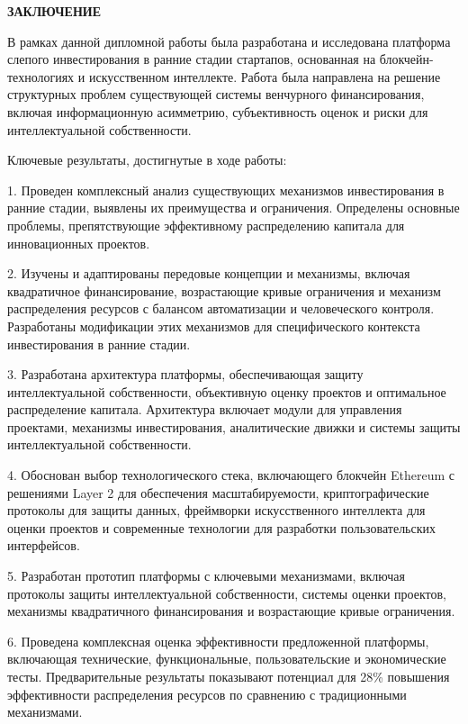 \documentclass[
    candidate, %
    subf, %
    dotsinheaders=false,
]{disser}
\begin{document}
\newpage
\begin{center}
  \textbf{ЗАКЛЮЧЕНИЕ}
\end{center}

В рамках данной дипломной работы была разработана и исследована платформа слепого инвестирования в ранние стадии стартапов, основанная на блокчейн-технологиях и искусственном интеллекте. Работа была направлена на решение структурных проблем существующей системы венчурного финансирования, включая информационную асимметрию, субъективность оценок и риски для интеллектуальной собственности.

Ключевые результаты, достигнутые в ходе работы:

1. Проведен комплексный анализ существующих механизмов инвестирования в ранние стадии, выявлены их преимущества и ограничения. Определены основные проблемы, препятствующие эффективному распределению капитала для инновационных проектов.

2. Изучены и адаптированы передовые концепции и механизмы, включая квадратичное финансирование, возрастающие кривые ограничения и механизм распределения ресурсов с балансом автоматизации и человеческого контроля. Разработаны модификации этих механизмов для специфического контекста инвестирования в ранние стадии.

3. Разработана архитектура платформы, обеспечивающая защиту интеллектуальной собственности, объективную оценку проектов и оптимальное распределение капитала. Архитектура включает модули для управления проектами, механизмы инвестирования, аналитические движки и системы защиты интеллектуальной собственности.

4. Обоснован выбор технологического стека, включающего блокчейн Ethereum с решениями Layer 2 для обеспечения масштабируемости, криптографические протоколы для защиты данных, фреймворки искусственного интеллекта для оценки проектов и современные технологии для разработки пользовательских интерфейсов.

5. Разработан прототип платформы с ключевыми механизмами, включая протоколы защиты интеллектуальной собственности, системы оценки проектов, механизмы квадратичного финансирования и возрастающие кривые ограничения.

6. Проведена комплексная оценка эффективности предложенной платформы, включающая технические, функциональные, пользовательские и экономические тесты. Предварительные результаты показывают потенциал для 28\% повышения эффективности распределения ресурсов по сравнению с традиционными механизмами.
\end{document}
